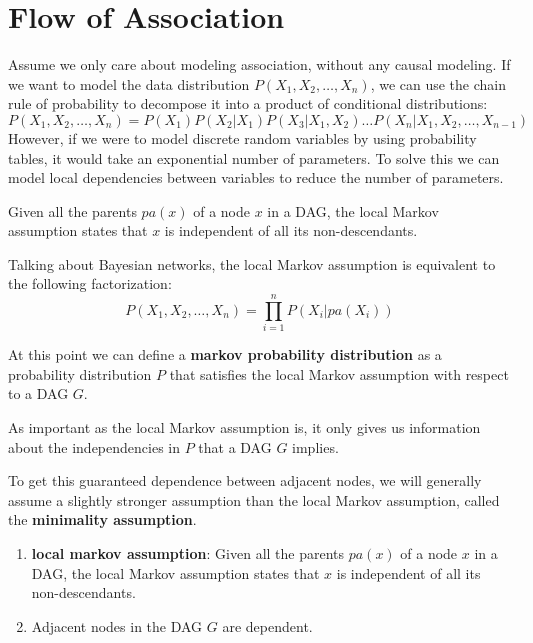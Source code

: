 \chapter{Flow of Association}
Assume we only care about modeling association, without any causal modeling. If
we want to model the data distribution $P(X_1, X_2, \ldots, X_n)$, we can use
the chain rule of probability to decompose it into a product of conditional
distributions:
\begin{equation}
    P(X_1, X_2, \ldots, X_n) = P(X_1)P(X_2|X_1)P(X_3|X_1, X_2)\ldots P(X_n|X_1, X_2, \ldots, X_{n-1})
\end{equation}
However, if we were to model discrete random variables by using probability
tables, it would take an exponential number of parameters. To solve this we
can model local dependencies between variables to reduce the number of
parameters.

\begin{definition}
    Given all the parents $pa(x)$ of a node $x$ in a DAG, the local Markov
    assumption states that $x$ is independent of all its non-descendants.
\end{definition}
Talking about Bayesian networks, the local Markov assumption is equivalent to
the following factorization:
\begin{equation}
    P(X_1, X_2, \ldots, X_n) = \prod_{i=1}^n P(X_i|pa(X_i))
\end{equation}

At this point we can define a \textbf{markov probability distribution} as a
probability distribution $P$ that satisfies the local Markov assumption with
respect to a DAG $G$.

As important as the local Markov assumption is, it only gives us information
about the independencies in $P$ that a DAG $G$ implies.

To get this guaranteed dependence between adjacent nodes, we will generally
assume a slightly stronger assumption than the local Markov assumption, called
the \textbf{minimality assumption}.
\begin{definition}
    \begin{enumerate}
        \item \textbf{local markov assumption}: Given all the parents $pa(x)$ of
              a node $x$ in a DAG, the local Markov assumption states that $x$
              is independent of all its non-descendants.
        \item Adjacent nodes in the DAG $G$ are dependent.
    \end{enumerate}
\end{definition}

